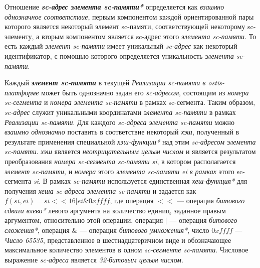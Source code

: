 \begin{SCn}
\begin{scnindent}
\end{scnindent}
\end{SCn}

Отношение \textbf{\textit{sc-адрес элемента sc-памяти*}} определяется как \textit{взаимно однозначное соответствие}, первым компонентом каждой ориентированной пары которого является некоторый элемент sc-памяти, соответствующей некоторому sc-элементу, а вторым компонентом является sc-адрес этого \textit{элемента sc-памяти}. То есть каждый \textit{элемент sc-памяти} имеет уникальный \textit{sc-адрес} как некоторый идентификатор, с помощью которого определяется уникальность \textit{элемента sc-памяти}.

Каждый \textbf{\textit{элемент sc-памяти}} в текущей \textit{Реализации sc-памяти в ostis-платформе} может быть однозначно задан его \textit{sc-адресом}, состоящим из \textit{номера sc-сегмента} и \textit{номера элемента sc-памяти} в рамках sc-сегмента. Таким образом, \textit{sc-адрес} служит уникальными координатами \textit{элемента sc-памяти} в рамках \textit{Реализации sc-памяти}.
Для каждого \textit{sc-адреса элемента sc-памяти} можно \textit{взаимно однозначно} поставить в соответствие некоторый \textit{хэш}, полученный в результате применения специальной \textit{хэш-функции*} над этим \textit{sc-адресом элемента sc-памяти}. \textit{хэш} является \textit{неотрицательным целым числом} и является результатом преобразования \textit{номера sc-сегмента sc-памяти} \textit{si}, в котором располагается \textit{элемент sc-памяти}, и \textit{номера} этого \textit{элемента sc-памяти} \textit{ei} \textit{в рамках} этого {sc-сегмента} \textit{si}. В рамках \textit{sc-памяти} используется единственная \textit{хеш-функция*} для получения \textit{хеша sc-адреса элемента sc-памяти} и задается как $f(si, ei) = si << 16 | ei \& 0xffff$, где операция $<<$ --- операция \textit{битового сдвига влево*} левого аргумента на количество единиц, заданное правым аргументом, относительно этой операции, операция $|$ --- операция \textit{битового сложения*}, операция $\&$ --- операция \textit{битового умножения*}, число $0xffff$ --- \textit{Число 65535}, представленное в шестнадцатеричном виде и обозначающее максимальное количество элементов в одном \textit{sc-сегменте sc-памяти}. Числовое выражение \textit{sc-адреса} является \textit{32-битовым целым числом}.

